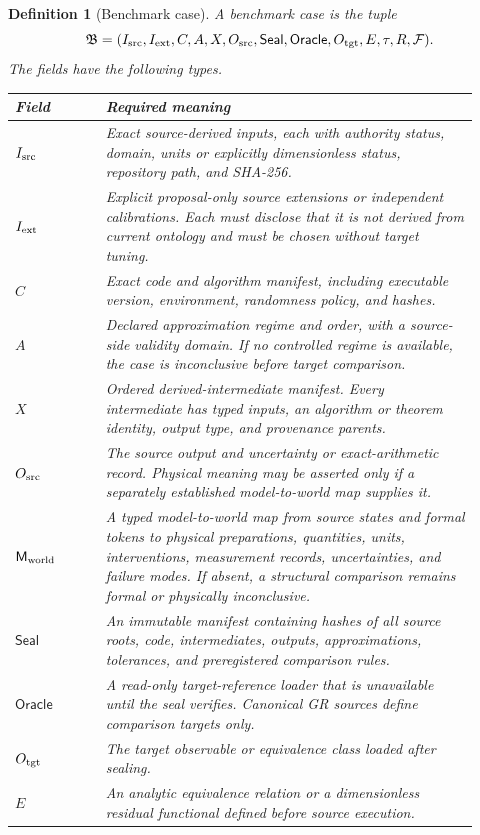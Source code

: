 \documentclass[11pt]{article}
\newtheorem{definition}{Definition}
\newcommand{\Seal}{\mathsf{Seal}}
\newcommand{\Oracle}{\mathsf{Oracle}}
\begin{document}
\begin{definition}[Benchmark case]
A benchmark case is the tuple
\[
 \mathfrak B =
 (I_{\rm src},I_{\rm ext},C,A,X,O_{\rm src},
  \Seal,\Oracle,O_{\rm tgt},E,\tau,R,\mathcal F).
\]
The fields have the following types.
\begin{longtable}{p{0.18\linewidth}p{0.74\linewidth}}
\toprule
Field & Required meaning\\
\midrule
\(I_{\rm src}\) &
Exact source-derived inputs, each with authority status, domain, units or
explicitly dimensionless status, repository path, and SHA-256.\\
\(I_{\rm ext}\) &
Explicit proposal-only source extensions or independent calibrations.  Each
must disclose that it is not derived from current ontology and must be chosen
without target tuning.\\
\(C\) &
Exact code and algorithm manifest, including executable version, environment,
randomness policy, and hashes.\\
\(A\) &
Declared approximation regime and order, with a source-side validity domain.
If no controlled regime is available, the case is inconclusive before target
comparison.\\
\(X\) &
Ordered derived-intermediate manifest.  Every intermediate has typed inputs,
an algorithm or theorem identity, output type, and provenance parents.\\
\(O_{\rm src}\) &
The source output and uncertainty or exact-arithmetic record.  Physical
meaning may be asserted only if a separately established model-to-world map
supplies it.\\
\(\mathsf M_{\rm world}\) &
A typed model-to-world map from source states and formal tokens to physical
preparations, quantities, units, interventions, measurement records,
uncertainties, and failure modes.  If absent, a structural comparison remains
formal or physically inconclusive.\\
\(\Seal\) &
An immutable manifest containing hashes of all source roots, code,
intermediates, outputs, approximations, tolerances, and preregistered
comparison rules.\\
\(\Oracle\) &
A read-only target-reference loader that is unavailable until the seal
verifies.  Canonical GR sources define comparison targets only.\\
\(O_{\rm tgt}\) &
The target observable or equivalence class loaded after sealing.\\
\(E\) &
An analytic equivalence relation or a dimensionless residual functional
defined before source execution.\\

\end{longtable}
\end{definition}
\end{document}
